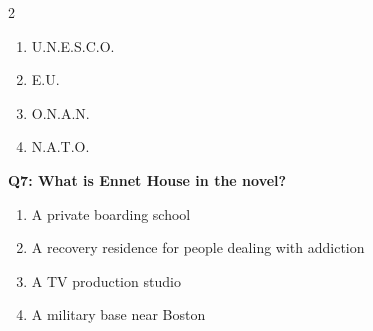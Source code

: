 \documentclass[10pt]{article}
\begin{document}
\begin{multicols}{2}
\begin{enumerate}[label=\arabic*.]
\item U.N.E.S.C.O.
\item E.U.
\item O.N.A.N.
\item N.A.T.O.
\end{enumerate}
\textbf{Q7: What is Ennet House in the novel?}

\begin{enumerate}[label=\arabic*.]
\item A private boarding school
\item A recovery residence for people dealing with addiction
\item A TV production studio
\item A military base near Boston
\end{enumerate}
\end{multicols}

\newpage
\end{document}
